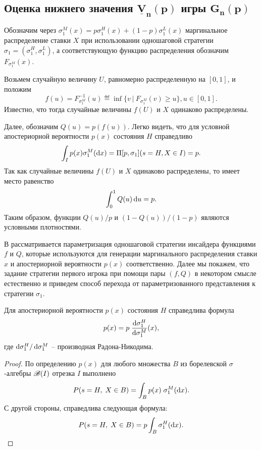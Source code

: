 {\subsection{Оценка нижнего значения $\mathbf{ \underline{V}_{n}(p) }$ игры $\mathbf{ G_{n}(p) }$}
\label{ch3:sec:-primal-game}

Обозначим через $\sigma^M_1(x) = p \sigma^H_1(x) + (1-p) \sigma^L_1(x)$ маргинальное распределение ставки $X$ при использовании одношаговой стратегии $\sigma_1 = (\sigma^H_1, \sigma^L_1)$, а соответствующую функцию распределения обозначим $F_{\sigma^M_1}(x)$.

Возьмем случайную величину $U$, равномерно распределенную на $[0, 1]$, и положим
\begin{equation*}
  f(u) = F^{-1}_{\sigma^M_1}(u) \eqdef \inf \{ v\ |\ F_{\sigma^M_1}(v) \geq u \}, u \in [0, 1].
\end{equation*}
Известно, что тогда случайные величины $f(U)$ и $X$ одинаково распределены.

Далее, обозначим $Q(u) = p(f(u))$.
Легко видеть, что для условной апостериорной вероятности $p(x)$ состояния $H$ справедливо
\begin{equation*}
  \int_I p(x) \sigma^M_1(\mathop{}\!\mathrm{d} x) = \Pi[p, \sigma_1](s = H, X \in I) = p.
\end{equation*}
Так как случайные величины $f(U)$ и $X$ одинаково распределены, то имеет место равенство
\begin{equation*}
  \int_0^1 Q(u) \mathop{}\!\mathrm{d} u = p.
\end{equation*}
Таким образом, функции $Q(u)/p$ и $(1-Q(u))/(1-p)$ являются условными плотностями.

В \cite{demeyer02} рассматривается параметризация одношаговой стратегии инсайдера функциями $f$ и $Q$, которые используются для генерации маргинального распределения ставки $x$ и апостериорной вероятности $p(x)$ соответственно.
Далее мы покажем, что задание стратегии первого игрока при помощи пары $(f, Q)$ в некотором смысле естественно и приведем способ перехода от параметризованного представления к стратегии $\sigma_1$.

\begin{proposition}
  Для апостериорной вероятности $p(x)$ состояния $H$ справедлива формула
  \begin{equation}\label{ch3:eq:p(x)}
    p(x) = p \; \frac{\mathop{}\!\mathrm{d} \sigma^H_1}{\mathop{}\!\mathrm{d} \sigma^M_1}(x),
  \end{equation}
  где $\mathop{}\!\mathrm{d} \sigma^H_1/\mathop{}\!\mathrm{d} \sigma^M_1$ -- производная Радона-Никодима.
\end{proposition}
\begin{proof}
  По определению $p(x)$ для любого множества $B$ из борелевской $\sigma$-алгебры $\mathscr{B}(I)$ отрезка $I$ выполнено
  \begin{equation*}
    P(s = H, \; X \in B) = \int_B p(x) \; \sigma^M_1(\mathop{}\!\mathrm{d} x).
  \end{equation*}
  С другой стороны, справедлива следующая формула:
  \begin{equation*}
    P(s = H, \; X \in B) = p \int_B \sigma^H_1(\mathop{}\!\mathrm{d} x).
  \end{equation*}


\end{proof}}
